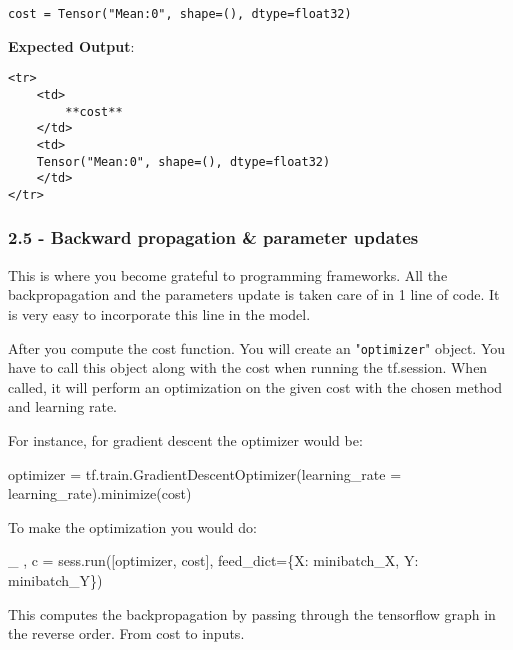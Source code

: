 \documentclass[11pt]{article}
\newenvironment{Shaded}{}{}
\newcommand{\NormalTok}[1]{{#1}}
\newcommand{\OperatorTok}[1]{\textcolor[rgb]{0.40,0.40,0.40}{{#1}}}
\begin{document}
    \begin{Verbatim}[commandchars=\\\{\}]
cost = Tensor("Mean:0", shape=(), dtype=float32)

    \end{Verbatim}

    \textbf{Expected Output}:

\begin{verbatim}
<tr> 
    <td>
        **cost**
    </td>
    <td>
    Tensor("Mean:0", shape=(), dtype=float32)
    </td>
</tr>
\end{verbatim}

    \subsubsection{2.5 - Backward propagation \& parameter
updates}\label{backward-propagation-parameter-updates}

This is where you become grateful to programming frameworks. All the
backpropagation and the parameters update is taken care of in 1 line of
code. It is very easy to incorporate this line in the model.

After you compute the cost function. You will create an
"\texttt{optimizer}" object. You have to call this object along with the
cost when running the tf.session. When called, it will perform an
optimization on the given cost with the chosen method and learning rate.

For instance, for gradient descent the optimizer would be:

\begin{Shaded}
\begin{Highlighting}[]
\NormalTok{optimizer }\OperatorTok{=}\NormalTok{ tf.train.GradientDescentOptimizer(learning_rate }\OperatorTok{=}\NormalTok{ learning_rate).minimize(cost)}
\end{Highlighting}
\end{Shaded}

To make the optimization you would do:

\begin{Shaded}
\begin{Highlighting}[]
\NormalTok{_ , c }\OperatorTok{=}\NormalTok{ sess.run([optimizer, cost], feed_dict}\OperatorTok{=}\NormalTok{\{X: minibatch_X, Y: minibatch_Y\})}
\end{Highlighting}
\end{Shaded}

This computes the backpropagation by passing through the tensorflow
graph in the reverse order. From cost to inputs.
\end{document}
